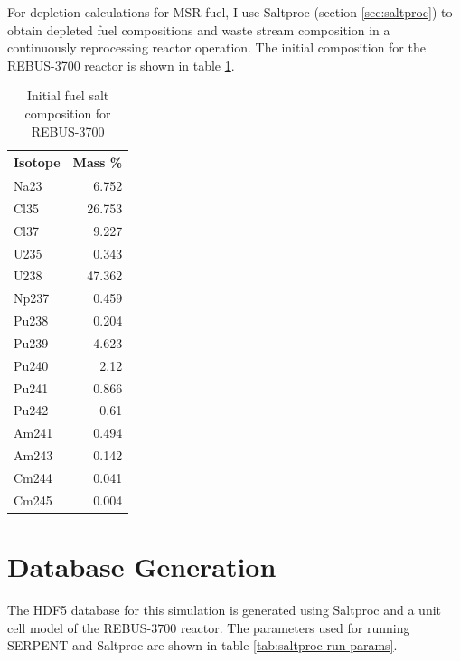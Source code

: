 For depletion calculations for \gls{MSR} fuel, I use Saltproc (section \ref{sec:saltproc})
to obtain depleted fuel compositions and waste stream composition in a continuously
reprocessing reactor operation. The initial composition for the REBUS-3700
reactor is shown in table \ref{tab:rebus_init}.


\begin{table}[h]
	\centering
	\caption{Initial fuel salt composition for REBUS-3700}
	\begin{tabular}{lr}
		\hline
		\textbf{Isotope} & \textbf{Mass \%}\\
		\hline
		Na23	&	6.752	\\
		Cl35	&	26.753	\\
		Cl37	&	9.227	\\
		U235	&	0.343	\\
		U238	&	47.362	\\
		Np237	&	0.459	\\
		Pu238	&	0.204	\\
		Pu239	&	4.623	\\
		Pu240	&	2.12	\\
		Pu241	&	0.866	\\
		Pu242	&	0.61	\\
		Am241	&	0.494	\\
		Am243	&	0.142	\\
		Cm244	&	0.041	\\
		Cm245	&	0.004	\\
		\hline
	\end{tabular}
	
	\label{tab:rebus_init}
	
\end{table}

\section{Database Generation}
The HDF5 database for this simulation is generated using Saltproc
and a unit cell model of the REBUS-3700 reactor. The parameters
used for running SERPENT and Saltproc are shown in table \ref{tab:saltproc-run-params}.

